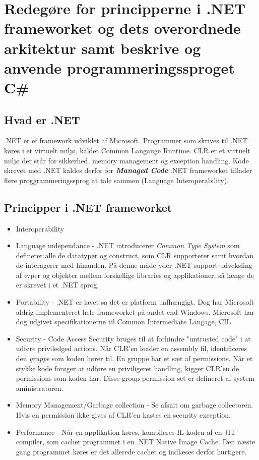 \section{Redegøre for principperne i .NET frameworket og dets overordnede arkitektur samt beskrive og anvende programmeringssproget C\#}\label{sec:spm1}

\subsection{Hvad er .NET}
.NET er ef framework udviklet af Microsoft. Programmer som skrives til .NET køres i et virtuelt miljø, kaldet Common Langauge Runtime. CLR er et virtuelt miljø der står for sikkerhed, memory management og exception handling. Kode skrevet med .NET kaldes derfor for \textbf{\textit{Managed Code}} .NET frameworket tillader flere proggrammeringssprog at tale sammen (Language Interoperability).


\subsection{Principper i .NET frameworket}

\begin{itemize}
	\item Interoperability
	\item Language independance - .NET introducerer \textit{Common Type System} som definerer alle de datatyper og construct, som CLR supporterer samt hvordan de interagerer med hinanden. På denne måde yder .NET support udveksling af typer og objekter mellem forskellige libraries og applikationer, så længe de er skrevet i et .NET sprog. 
	\item Portability - .NET er lavet så det er platform uafhængigt. Dog har Microsoft aldrig implementeret hele frameworket på andet end Windows. Microsoft har dog udgivet specifikationerne til Common Intermediate Langage, CIL.
	\item Security - Code Access Security bruges til at forhindre "untrusted code" i at udføre priviledged actions. Når CLR'en loader en assembly fil, identificeres den \textit{gruppe} som koden hører til. En gruppe har et sæt af permissions. Når et stykke kode forøger at udføre en priviligeret handling, kigger CLR'en de permissions som koden har. Disse group permission set er defineret af system aministratoren.
	\item Memory Management/Garbage collection - Se afsnit om garbage collectoren. Hvis en permission ikke gives af CLR'en kastes en security exception.
	\item Performance - Når en applikation køres, kompileres IL koden af en JIT compiler, som cacher programmet i en .NET Native Image Cache. Den næste gang programmet køres er det allerede cachet og indlæses derfor hurtigere.
\end{itemize}

